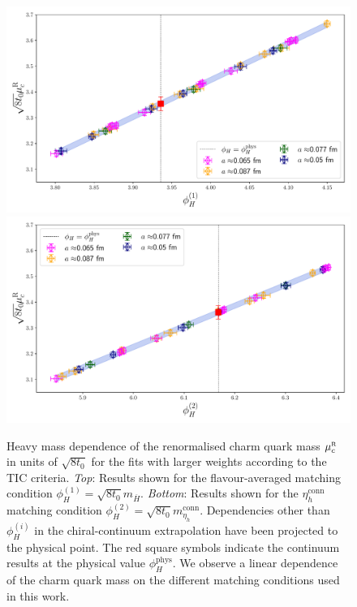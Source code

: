  \begin{figure}[!htb]
 	\centering
 	\includegraphics[scale=0.50]{./cap6/figs/mc/fit_phih_interp_muc_fl_ave.pdf}
 	\includegraphics[scale=0.50]{./cap6/figs/mc/fit_phih_interp_muc_etac.pdf}
 	\caption{ Heavy mass dependence of the renormalised charm quark mass $\mu_c^{\rm\scriptscriptstyle R}$ in units of $\sqrt{8t_0}$ for the fits with larger weights according to the TIC criteria. \textit{Top}: Results shown for the flavour-averaged matching condition $\phi_{H}^{(1)} = \sqrt{8t_0} m_{\overline{H}}$. \textit{Bottom}: Results shown for the $\eta_h^{\mathrm{conn}}$ matching condition $\phi_{H}^{(2)} = \sqrt{8t_0} m_{\eta_h}^{\mathrm{conn}}$. Dependencies other than $\phi_H^{(i)}$ in the chiral-continuum extrapolation have been projected to the physical point. The red square symbols indicate the continuum results at the physical value $\phi_H^{\mathrm{phys}}$. We observe a linear dependence of the charm quark mass on the different matching conditions used in this work. }
 	\label{fig:mc_mh_dependence}
 \end{figure}

